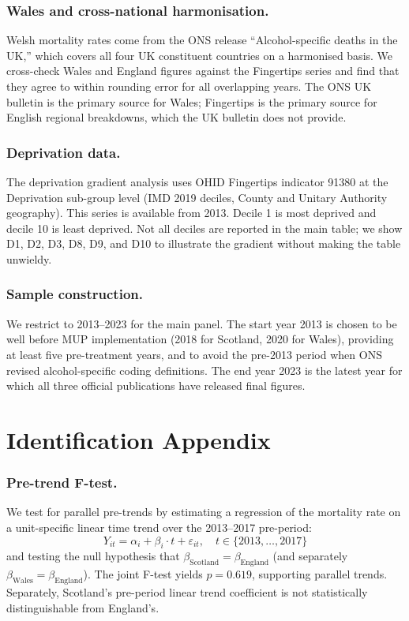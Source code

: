 \documentclass[12pt]{article}
\begin{document}
\subsubsection*{Wales and cross-national harmonisation.} Welsh mortality rates come from the ONS release ``Alcohol-specific deaths in the UK,'' which covers all four UK constituent countries on a harmonised basis. We cross-check Wales and England figures against the Fingertips series and find that they agree to within rounding error for all overlapping years. The ONS UK bulletin is the primary source for Wales; Fingertips is the primary source for English regional breakdowns, which the UK bulletin does not provide.

\subsubsection*{Deprivation data.} The deprivation gradient analysis uses OHID Fingertips indicator 91380 at the Deprivation sub-group level (IMD 2019 deciles, County and Unitary Authority geography). This series is available from 2013. Decile 1 is most deprived and decile 10 is least deprived. Not all deciles are reported in the main table; we show D1, D2, D3, D8, D9, and D10 to illustrate the gradient without making the table unwieldy.

\subsubsection*{Sample construction.} We restrict to 2013--2023 for the main panel. The start year 2013 is chosen to be well before MUP implementation (2018 for Scotland, 2020 for Wales), providing at least five pre-treatment years, and to avoid the pre-2013 period when ONS revised alcohol-specific coding definitions. The end year 2023 is the latest year for which all three official publications have released final figures.

\section{Identification Appendix}
\label{sec:ident_appendix}

\subsubsection*{Pre-trend F-test.} We test for parallel pre-trends by estimating a regression of the mortality rate on a unit-specific linear time trend over the 2013--2017 pre-period:
\begin{equation}
Y_{it} = \alpha_i + \beta_i \cdot t + \varepsilon_{it}, \quad t \in \{2013,\ldots,2017\}
\end{equation}
and testing the null hypothesis that $\beta_{\text{Scotland}} = \beta_{\text{England}}$ (and separately $\beta_{\text{Wales}} = \beta_{\text{England}}$). The joint F-test yields $p = 0.619$, supporting parallel trends. Separately, Scotland's pre-period linear trend coefficient is not statistically distinguishable from England's.
\end{document}
